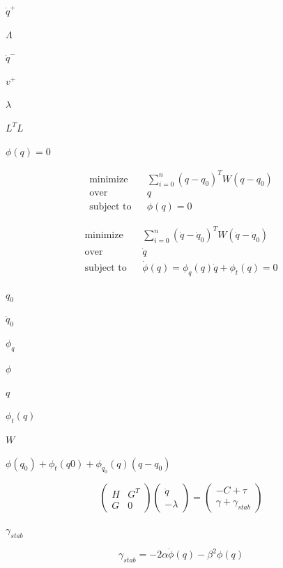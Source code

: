 \documentclass{article}
\begin{document}
$\dot{q}^{+}$
\pagebreak

$\Lambda$
\pagebreak

$\dot{q}^{-}$
\pagebreak

$v^{+}$
\pagebreak

$\lambda$
\pagebreak

$L^TL$
\pagebreak

$\phi (q) = 0$
\pagebreak

\begin{eqnarray*}
  \text{minimize} && \sum_{i = 0}^{n} (q - q_{0})^T W (q - q_{0}) \\
  \text{over} && q \\
  \text{subject to} && \phi (q) = 0
  \end{eqnarray*}
\pagebreak

\begin{eqnarray*}
  \text{minimize} && \sum_{i = 0}^{n} (\dot{q} - \dot{q}_{0})^T W (\dot{q} - \dot{q}_{0}) \\
  \text{over} && \dot{q} \\
  \text{subject to} && \dot{\phi} (q) = \phi _{q}(q) \dot{q} + \phi _{t}(q) = 0
  \end{eqnarray*}
\pagebreak

$q_{0}$
\pagebreak

$\dot{q}_{0}$
\pagebreak

$\phi _{q}$
\pagebreak

$\phi$
\pagebreak

$q$
\pagebreak

$\phi _{t}(q)$
\pagebreak

$W$
\pagebreak

$ \phi (q_{0}) + \phi _{t}(q0) + \phi _{q_0}(q) (q - q_{0}) $
\pagebreak

\[
\left(
  \begin{array}{cc}
    H & G^T \\
    G & 0
  \end{array}
\right)
\left(
  \begin{array}{c}
    \ddot{q} \\
    - \lambda
  \end{array}
\right)
=
\left(
  \begin{array}{c}
    -C + \tau \\
    \gamma + \gamma _{stab}
  \end{array}
\right)
  \]
\pagebreak

$\gamma _{stab}$
\pagebreak

\[
  \gamma _{stab} = - 2 \alpha \dot{\phi} (q) - \beta^2 \phi (q)
  \]
\pagebreak
\end{document}
